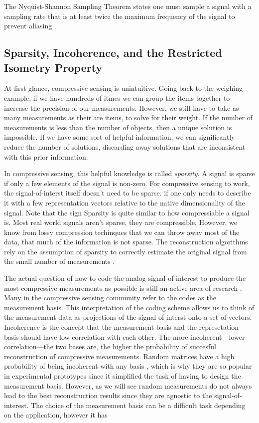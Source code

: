 The Nyquist-Shannon Sampling Theorem states one must sample a signal with a sampling rate that is at least twice the maximum frequency of the signal to prevent aliasing \cite{shannon1949communication}.


\subsection{Sparsity, Incoherence, and the Restricted Isometry Property}

At first glance, compressive sensing is unintuitive. Going back to the weighing example, if we have hundreds of itmes we can group the items together to increase the precision of our measurements. However, we still have to take as many measurements as their are items, to solve for their weight. If the number of measurements is less than the number of objects, then a unique solution is impossible. If we have some sort of helpful information, we can significantly reduce the number of solutions, discarding away solutions that are inconsistent with this prior information. 

In compressive sensing, this helpful knowledge is called \emph{sparsity}. A signal is sparse if only a few elements of the signal is non-zero. For compressive sensing to work, the signal-of-interst itself doesn't need to be sparse.  if one only needs to describe it with a few representation vectors relative to the native dimensionality of the signal. Note that the sign  Sparsity is quite similar to how compressiable a signal is. Most real world signals aren't sparse, they are compressible. However, we know from lossy compression techinques that we can throw away most of the data, that much of the information is not sparse. The reconstruction algorithms rely on the assumption of sparsity to correctly estimate the original signal from the small number of measurements \cite{}.

The actual question of how to code the analog signal-of-interest to produce the most compressive measurements as possible is still an active area of research \cite{}. Many in the compressive sensing community refer to the codes as the measurement basis. This interpretation of the coding scheme allows us to think of the measurement data as projections of the signal-of-interst onto a set of vectors. Incoherence is the concept that the measurement basis and the represetation basis should have low correlation with each other. The more incoherent---lower correlation---the two bases are, the higher the probability of succesful reconstruction of compressive measurements. Random matrices have a high probability of being incoherent with any basis \cite{candes2008introduction}, which is why they are so popular in experimental prototypes \cite{} since it simplified the task of having to design the measurement basis. However, as we will see random measurements do not always lead to the best reconstruction results since they are agnostic to the signal-of-interest. The choice of the measurement basis can be a difficult task depending on the application, however it has 


